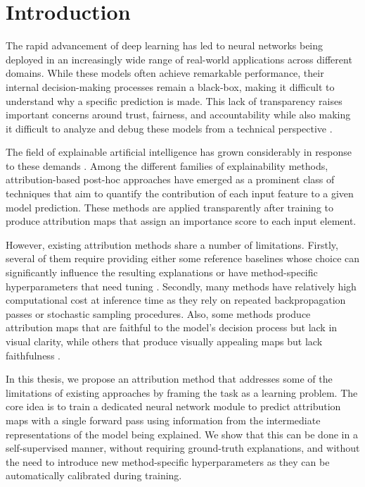 \chapter{Introduction}

The rapid advancement of deep learning has led to neural networks being deployed in an increasingly wide range of real-world applications across different domains. While these models often achieve remarkable performance, their internal decision-making processes remain a black-box, making it difficult to understand why a specific prediction is made. This lack of transparency raises important concerns around trust, fairness, and accountability while also making it difficult to analyze and debug these models from a technical perspective \cite{2019_xai, 2020_xai}.

The field of explainable artificial intelligence has grown considerably in response to these demands \cite{2024_xai_manifesto, 2020_xai_survey, 2021_xai_multidisciplinary}. Among the different families of explainability methods, attribution-based post-hoc approaches have emerged as a prominent class of techniques that aim to quantify the contribution of each input feature to a given model prediction. These methods are applied transparently after training to produce attribution maps that assign an importance score to each input element.

However, existing attribution methods share a number of limitations. Firstly, several of them require providing either some reference baselines whose choice can significantly influence the resulting explanations or have method-specific hyperparameters that need tuning \cite{lig, deeplift, gradient_shap}. Secondly, many methods have relatively high computational cost at inference time as they rely on repeated backpropagation passes or stochastic sampling procedures. Also, some methods produce attribution maps that are faithful to the model's decision process but lack in visual clarity, while others that produce visually appealing maps but lack faithfulness \cite{gevaert2024evaluating,L_fstr_m_2022}. 

In this thesis, we propose an attribution method that addresses some of the limitations of existing approaches by framing the task as a learning problem. The core idea is to train a dedicated neural network module to predict attribution maps with a single forward pass using information from the intermediate representations of the model being explained. We show that this can be done in a self-supervised manner, without requiring ground-truth explanations, and without the need to introduce new method-specific hyperparameters as they can be automatically calibrated during training.


